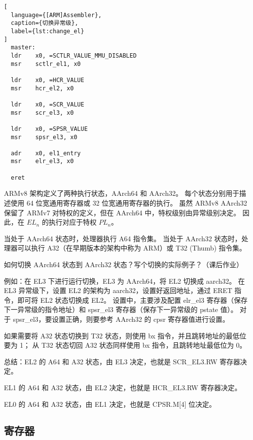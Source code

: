 \begin{lstlisting}[
  language={[ARM]Assembler},
  caption={切换异常级},
  label={lst:change_el}
]
  master:
  ldr    x0, =SCTLR_VALUE_MMU_DISABLED
  msr    sctlr_el1, x0

  ldr    x0, =HCR_VALUE
  msr    hcr_el2, x0

  ldr    x0, =SCR_VALUE
  msr    scr_el3, x0

  ldr    x0, =SPSR_VALUE
  msr    spsr_el3, x0

  adr    x0, el1_entry
  msr    elr_el3, x0

  eret
\end{lstlisting}


ARMv8 架构定义了两种执行状态，AArch64 和 AArch32。
每个状态分别用于描述使用 64 位宽通用寄存器或 32 位宽通用寄存器的执行。
虽然 ARMv8 AArch32 保留了 ARMv7 对特权的定义，但在 AArch64 中，特权级别由异常级别决定。
因此，在 $EL_n$ 的执行对应于特权 $PL_n$。

当处于 AArch64 状态时，处理器执行 A64 指令集。
当处于 AArch32 状态时，处理器可以执行 A32（在早期版本的架构中称为 ARM）或 T32 (Thumb) 指令集。

\begin{probsolu}[title={Problem and Solution \theprob}]{
    如何切换 AArch64 状态到 AArch32 状态？写个切换的实际例子？（课后作业）
  }\label{pb:state_changing}
  
  例如：在 EL3 下进行运行切换，EL3 为 AArch64，将 EL2 切换成 aarch32。
  在 EL3 异常级下，设置 EL2 的架构为 aarch32，设置好返回地址，通过 ERET 指令，即可将 EL2 状态切换成 EL2。
  设置中，主要涉及配置 elr\_el3 寄存器（保存下一异常级的指令地址）和 spsr\_el3 寄存器（保存下一异常级的 pstate 值）。
  对于 spsr\_el3，要设置正确，则要参考 AArch32 的 cpsr 寄存器值进行设置。

  如果需要将 A32 状态切换到 T32 状态，则使用 bx 指令，并且跳转地址的最低位要为 1；
  从 T32 状态切回 A32 状态同样使用 bx 指令，且跳转地址最低位为 0。
  
  总结：EL2 的 A64 和 A32 状态，由 EL3 决定，也就是 SCR\_EL3.RW 寄存器决定。

  EL1 的 A64 和 A32 状态，由 EL2 决定，也就是 HCR\_EL3.RW 寄存器决定。

  EL0 的 A64 和 A32 状态，由 EL1 决定，也就是 CPSR.M[4] 位决定。
\end{probsolu}

\subsection{寄存器}

